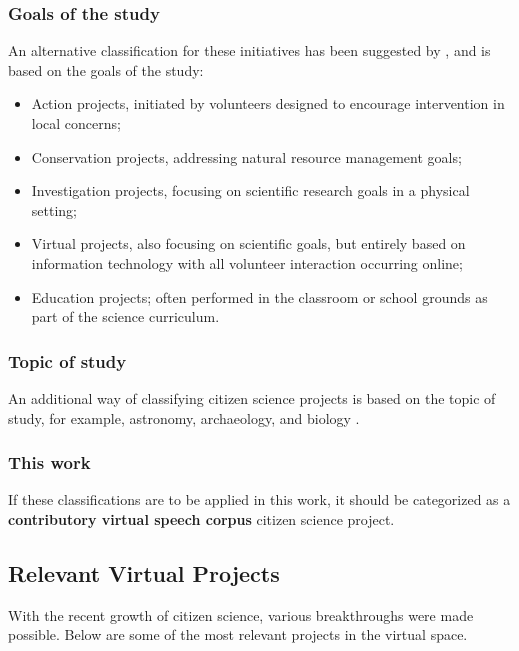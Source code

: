 \subsubsection{Goals of the study}

An alternative classification for these initiatives has been suggested by \cite{wiggins2011conservation}, and is based on the goals of the study:

\begin{itemize}
    \item Action projects, initiated by volunteers designed to encourage intervention in local concerns;
    \item Conservation projects, addressing natural resource management goals;
    \item Investigation projects, focusing on scientific research goals in a physical setting;
    \item Virtual projects, also focusing on scientific goals, but entirely based on information technology with all volunteer interaction occurring online;
    \item Education projects; often performed in the classroom or school grounds as part of the science curriculum.
\end{itemize}

\subsubsection{Topic of study}

An additional way of classifying citizen science projects is based on the topic of study, for example, astronomy, archaeology, and biology \cite{wiggins2011conservation}. 

\subsubsection{This work}

If these classifications are to be applied in this work, it should be categorized as a \textbf{contributory virtual speech corpus} citizen science project.

\subsection{Relevant Virtual Projects}

With the recent growth of citizen science, various breakthroughs were made possible. Below are some of the most relevant projects in the virtual space.

